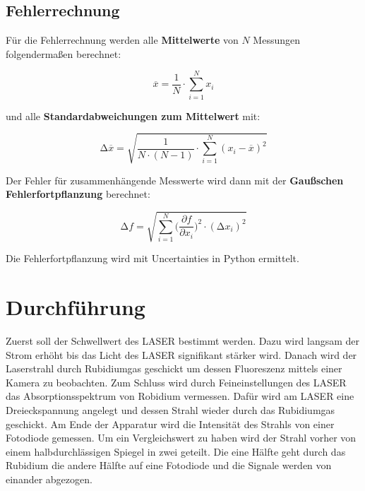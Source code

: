 \subsection{Fehlerrechnung}
Für die Fehlerrechnung werden alle \textbf{Mittelwerte} von $N$ Messungen folgendermaßen berechnet:

\begin{equation}
    \overline{x} = \frac{1}{N} \cdot \sum_{i=1}^N x_i
    \label{eqn:Mittelwert}
\end{equation}

und alle \textbf{Standardabweichungen zum Mittelwert} mit:

\begin{equation}
    \increment\overline{x} = \sqrt{\frac{1}{N\cdot(N-1)}\cdot\sum_{i=1}^N (x_i-\overline{x})^2}
    \label{eqn:St_Mittelwert}
\end{equation}

Der Fehler für zusammenhängende Messwerte wird dann mit der \textbf{Gaußschen Fehlerfortpflanzung} berechnet:

\begin{equation}
    \increment{f} = \sqrt{ \sum_{i = 1}^{N}  \biggl(\frac{\partial{f}}{\partial{x_i}}\biggr)^2\cdot(\increment{x_i})^2}
    \label{eqn:Gauss}
\end{equation}

Die Fehlerfortpflanzung wird mit Uncertainties in Python \cite{uncertainties} ermittelt.


\section{Durchführung}
Zuerst soll der Schwellwert des LASER bestimmt werden. 
Dazu wird langsam der Strom erhöht bis das Licht des LASER signifikant stärker wird. 
Danach wird der Laserstrahl durch Rubidiumgas geschickt um dessen Fluoreszenz mittels einer Kamera zu beobachten. 
Zum Schluss wird durch Feineinstellungen des LASER das Absorptionsspektrum von Robidium vermessen. 
Dafür wird am LASER eine Dreieckspannung angelegt und dessen Strahl wieder durch das Rubidiumgas geschickt.
Am Ende der Apparatur wird die Intensität des Strahls von einer Fotodiode gemessen. 
Um ein Vergleichswert zu haben wird der Strahl vorher von einem halbdurchlässigen Spiegel in zwei geteilt. 
Die eine Hälfte geht durch das Rubidium die andere Hälfte auf eine Fotodiode und die Signale werden von einander abgezogen.


